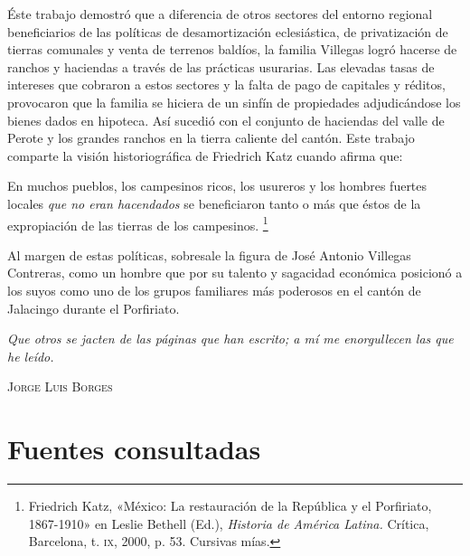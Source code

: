 \documentclass[14pt,twoside,final]{extbook} %
\let\oldfootnote\footnote
\renewcommand\footnote[1]{%
\oldfootnote{\hspace{1mm}#1}}
\begin{document}
Éste trabajo demostró que a diferencia de otros sectores del entorno regional beneficiarios de las políticas de desamortización eclesiástica, de privatización de tierras comunales y venta de terrenos baldíos, la familia Villegas logró hacerse de ranchos y haciendas a través de las prácticas usurarias. Las elevadas tasas de intereses que cobraron a estos sectores y la falta de pago de capitales y réditos, provocaron que la familia se hiciera de un sinfín de propiedades adjudicándose los bienes dados en hipoteca. Así sucedió con el conjunto de haciendas del valle de Perote y los grandes ranchos en la tierra caliente del cantón. Este trabajo comparte la visión historiográfica de Friedrich Katz cuando afirma que:
\begin{quoting}
En muchos pueblos, los campesinos ricos, los usureros y los hombres fuertes locales \emph{que no eran hacendados} se beneficiaron tanto o más que éstos de la expropiación de las tierras de los campesinos.\footnote{Friedrich Katz, «México: La restauración de la República y el Porfiriato, 1867-1910» en Leslie Bethell (Ed.), \emph{Historia de América Latina.} Crítica, Barcelona, t. \textsc{ix}, 2000, p. 53. Cursivas mías.}
\end{quoting}
Al margen de estas políticas, sobresale la figura de José Antonio Villegas Contreras, como un hombre que por su talento y sagacidad económica posicionó a los suyos como uno de los grupos familiares más poderosos en el cantón de Jalacingo durante el Porfiriato.
\newpage
\pagestyle{empty}
\null\vfill
\newpage
\pagestyle{empty}
\begin{flushright}
\begin{minipage}{7.9cm}
\emph{Que otros se jacten de las páginas que han escrito; a mí me enorgullecen las que he leído.}
\end{minipage}
\end{flushright}
\begin{flushright}
\textsc{Jorge Luis Borges}
\end{flushright}
\chapter*{Fuentes consultadas}
\label{ch:fuentes-consultadas}
\thispagestyle{empty}
\pagestyle{fancy}
\fancyhf{} %
\fancyhead[RO,LE]{\thepage}
\renewcommand{\headrulewidth}{0pt}
\end{document}
